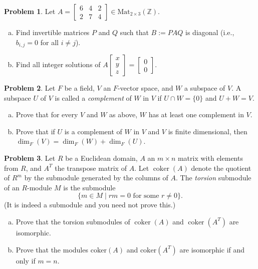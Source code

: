 \documentclass[11pt]{article}
\DeclareMathOperator{\coker}{coker}
\newcommand{\Z}{\mathbb{Z}}
\theoremstyle{definition}
\newtheorem{problem}{Problem}
\begin{document}
\begin{problem}
Let $A = \begin{bmatrix} 6 & 4 & 2 \\ 2 & 7 & 4 \end{bmatrix} \in \mathrm{Mat}_{2 \times 3}(\Z)$. 

\begin{enumerate}[(a)]

\item Find invertible matrices $P$ and $Q$ such that $B := PAQ$ is diagonal (i.e., $b_{i,j} = 0$ for 
all $i \ne j$). 

\item Find all integer solutions of $A \begin{bmatrix} x \\ y \\ z \end{bmatrix} = \begin{bmatrix} 
0 \\ 0 \end{bmatrix}$.


\end{enumerate}
\end{problem}


\begin{problem}
Let $F$ be a field, $V$ an $F$-vector space, and $W$ a subspace of $V$. A subspace $U$ of $V$ is called a {\em complement} of
  $W$  in $V$ if $U \cap W = \{0\}$ and $U + W = V$. 

  \begin{enumerate}[(a)]
     \item Prove that for every $V$ and $W$ as above, $W$ has at least one complement in $V$.
     \item Prove that if $U$ is a complement of $W$ in $V$ and $V$ is finite dimensional, then $\dim_F(V)=\dim_F(W)+\dim_F(U)$.
     \end{enumerate}\end{problem}

\begin{problem} Let $R$ be a Euclidean domain, $A$ an $m \times n$ matrix with elements from $R$, and $A^T$ the transpose matrix of $A$.
         Let $\coker(A)$ denote the quotient of $R^m$ by the submodule generated by the columns of $A$. The {\em torsion} submodule of an $R$-module
         $M$ is the submodule \[\{m \in M \mid rm = 0 \text{ for some $r \ne 0$}\}.\] (It is indeed a submodule and you need not prove this.) 

         \begin{enumerate}[(a)]
       \item  Prove that the torsion submodules of $\coker(A)$ and $\coker(A^T)$ are isomorphic.

         \item Prove that the modules $\mathrm{coker}(A)$ and $\mathrm{coker}(A^T)$ are isomorphic if and only if $m = n$.

        \end{enumerate}
\end{problem}
\end{document}
